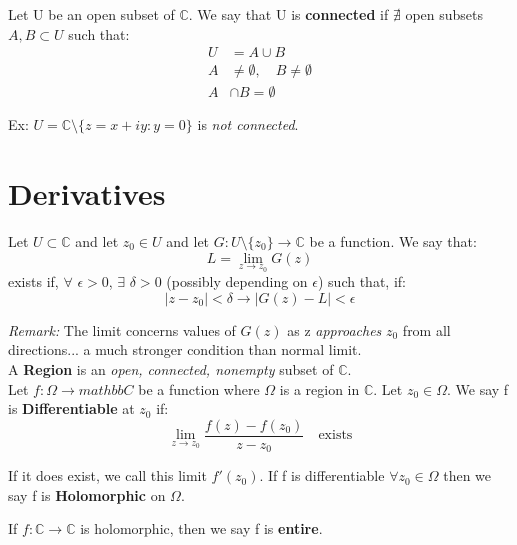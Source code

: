\documentclass[a4paper, 11pt]{article}
\begin{document}
Let U be an open subset of $\mathbb{C}$. We say that U is \textbf{connected} if $\nexists$ open subsets $A, B \subset U$ such that: 
	\begin{align}
		U &= A \cup B \\ 
		A &\neq \emptyset, \quad B \neq \emptyset \\ 
		A &\cap B = \emptyset	
	\end{align}

Ex: $U = \mathbb{C}\setminus\{z=x+iy:y=0\}$ is \textit{not connected}.



\section*{Derivatives}

Let $U\subset \mathbb{C}$ and let $z_0 \in U$ and let $G:U\setminus\{z_0\}\rightarrow \mathbb{C}$ be a function. We say that:
	\begin{equation}
		L  = \lim_{z\rightarrow z_0}G(z)
	\end{equation}
exists if, $\forall$ $\epsilon>0$, $\exists$ $\delta>0$ (possibly depending on $\epsilon$) such that, if:
	\begin{equation}
		|z-z_0|< \delta \rightarrow |G(z)-L|< \epsilon 
	\end{equation}
	
\textit{Remark:} The limit concerns values of $G(z)$ as z \textit{approaches} $z_0$ from all directions... a much stronger condition than normal limit. \\

\noindent A \textbf{Region} is an \textit{open, connected, nonempty} subset of $\mathbb{C}$. \\

Let $f:\Omega \rightarrow mathbb{C}$ be a function where $\Omega$ is a region in $\mathbb{C}$. Let $z_0\in\Omega$. We say f is \textbf{Differentiable} at $z_0$ if:
	\begin{equation}
		\lim_{z\rightarrow z_0} \frac{f(z)-f(z_0)}{z-z_0} \quad \text{exists}
	\end{equation}
	
\noindent If it does exist, we call this limit $f'(z_0)$. If f is differentiable $\forall z_0 \in \Omega$ then we say f is \textbf{Holomorphic} on $\Omega$. 


\noindent If $f:\mathbb{C} \rightarrow \mathbb{C}$ is holomorphic, then we say f is \textbf{entire}. \\ \\ \\
\end{document}
